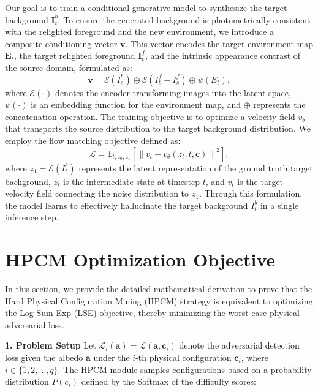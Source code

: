 Our goal is to train a conditional generative model to synthesize the target background $\bm{I}_t^b$. 
To ensure the generated background is photometrically consistent with the relighted foreground and the new environment, we introduce a composite conditioning vector $\mathbf{v}$.
This vector encodes the target environment map $\bm{E}_t$, the target relighted foreground $\bm{I}_t^f$, and the intrinsic appearance contrast of the source domain, formulated as:
\begin{equation}
    \mathbf{v} = \mathcal{E}(I_s^b) \oplus \mathcal{E}(I_t^f - I_s^f) \oplus \psi(E_t),
\end{equation}
where $\mathcal{E}(\cdot)$ denotes the encoder transforming images into the latent space, $\psi(\cdot)$ is an embedding function for the environment map, and $\oplus$ represents the concatenation operation.
The training objective is to optimize a velocity field $v_\theta$ that transports the source distribution to the target background distribution. We employ the flow matching objective defined as:
\begin{equation}
    \mathcal{L} = \mathbb{E}_{t, z_0, z_1} \left[ \left\| v_t - v_\theta(z_t, t, \mathbf{c}) \right\|^2 \right],
\end{equation}
where $z_1 = \mathcal{E}(I_t^b)$ represents the latent representation of the ground truth target background, $z_t$ is the intermediate state at timestep $t$, and $v_t$ is the target velocity field connecting the noise distribution to $z_1$. Through this formulation, the model learns to effectively hallucinate the target background $I_t^b$ in a single inference step.



\section{HPCM Optimization Objective} 

In this section, we provide the detailed mathematical derivation to prove that the Hard Physical Configuration Mining (HPCM) strategy is equivalent to optimizing the Log-Sum-Exp (LSE) objective, thereby minimizing the worst-case physical adversarial loss.

\textbf{1. Problem Setup}
Let $\mathcal{L}_i(\mathbf{a}) = \mathcal{L}(\mathbf{a}, \bm{c}_i)$ denote the adversarial detection loss given the albedo $\mathbf{a}$ under the $i$-th physical configuration $\bm{c}_i$, where $i \in \{1, 2,\dots,q\}$.
The HPCM module samples configurations based on a probability distribution $P(c_i)$ defined by the Softmax of the difficulty scores:

